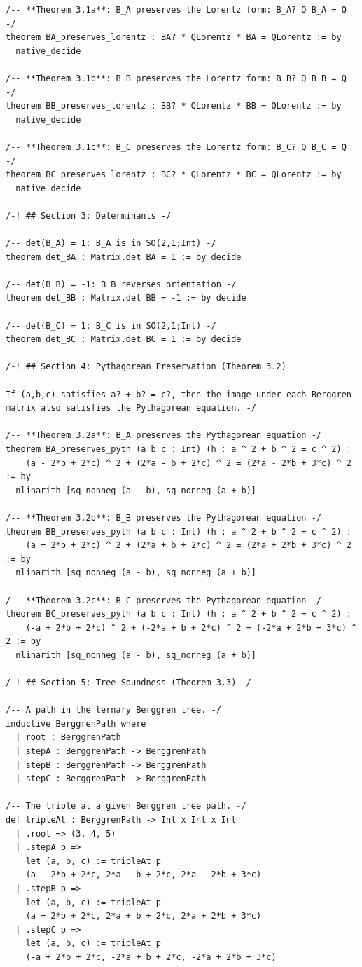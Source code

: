 \documentclass[11pt,twoside,openright]{book}
\theoremstyle{definition}
\theoremstyle{remark}
\begin{document}
\begin{lstlisting}[style=lean]
/-- **Theorem 3.1a**: B_A preserves the Lorentz form: B_A? Q B_A = Q -/
theorem BA_preserves_lorentz : BA? * QLorentz * BA = QLorentz := by
  native_decide

/-- **Theorem 3.1b**: B_B preserves the Lorentz form: B_B? Q B_B = Q -/
theorem BB_preserves_lorentz : BB? * QLorentz * BB = QLorentz := by
  native_decide

/-- **Theorem 3.1c**: B_C preserves the Lorentz form: B_C? Q B_C = Q -/
theorem BC_preserves_lorentz : BC? * QLorentz * BC = QLorentz := by
  native_decide

/-! ## Section 3: Determinants -/

/-- det(B_A) = 1: B_A is in SO(2,1;Int) -/
theorem det_BA : Matrix.det BA = 1 := by decide

/-- det(B_B) = -1: B_B reverses orientation -/
theorem det_BB : Matrix.det BB = -1 := by decide

/-- det(B_C) = 1: B_C is in SO(2,1;Int) -/
theorem det_BC : Matrix.det BC = 1 := by decide

/-! ## Section 4: Pythagorean Preservation (Theorem 3.2)

If (a,b,c) satisfies a? + b? = c?, then the image under each Berggren
matrix also satisfies the Pythagorean equation. -/

/-- **Theorem 3.2a**: B_A preserves the Pythagorean equation -/
theorem BA_preserves_pyth (a b c : Int) (h : a ^ 2 + b ^ 2 = c ^ 2) :
    (a - 2*b + 2*c) ^ 2 + (2*a - b + 2*c) ^ 2 = (2*a - 2*b + 3*c) ^ 2 := by
  nlinarith [sq_nonneg (a - b), sq_nonneg (a + b)]

/-- **Theorem 3.2b**: B_B preserves the Pythagorean equation -/
theorem BB_preserves_pyth (a b c : Int) (h : a ^ 2 + b ^ 2 = c ^ 2) :
    (a + 2*b + 2*c) ^ 2 + (2*a + b + 2*c) ^ 2 = (2*a + 2*b + 3*c) ^ 2 := by
  nlinarith [sq_nonneg (a - b), sq_nonneg (a + b)]

/-- **Theorem 3.2c**: B_C preserves the Pythagorean equation -/
theorem BC_preserves_pyth (a b c : Int) (h : a ^ 2 + b ^ 2 = c ^ 2) :
    (-a + 2*b + 2*c) ^ 2 + (-2*a + b + 2*c) ^ 2 = (-2*a + 2*b + 3*c) ^ 2 := by
  nlinarith [sq_nonneg (a - b), sq_nonneg (a + b)]

/-! ## Section 5: Tree Soundness (Theorem 3.3) -/

/-- A path in the ternary Berggren tree. -/
inductive BerggrenPath where
  | root : BerggrenPath
  | stepA : BerggrenPath -> BerggrenPath
  | stepB : BerggrenPath -> BerggrenPath
  | stepC : BerggrenPath -> BerggrenPath

/-- The triple at a given Berggren tree path. -/
def tripleAt : BerggrenPath -> Int x Int x Int
  | .root => (3, 4, 5)
  | .stepA p =>
    let (a, b, c) := tripleAt p
    (a - 2*b + 2*c, 2*a - b + 2*c, 2*a - 2*b + 3*c)
  | .stepB p =>
    let (a, b, c) := tripleAt p
    (a + 2*b + 2*c, 2*a + b + 2*c, 2*a + 2*b + 3*c)
  | .stepC p =>
    let (a, b, c) := tripleAt p
    (-a + 2*b + 2*c, -2*a + b + 2*c, -2*a + 2*b + 3*c)


\end{lstlisting}
\end{document}
